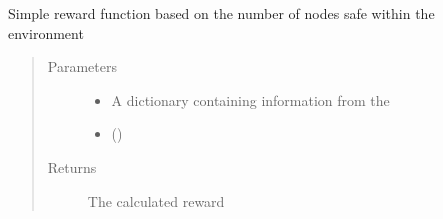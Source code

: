 \documentclass[letterpaper,10pt,english]{sphinxmanual}
\begin{document}
\begin{fulllineitems}
\label{\detokenize{source/yawning_titan.envs.generic.core:yawning_titan.envs.generic.core.reward_functions.num_nodes_safe}}
\sphinxAtStartPar
Simple reward function based on the number of nodes safe
within the environment
\begin{quote}\begin{description}
\item[{Parameters}] \leavevmode\begin{itemize}
\item {}
\sphinxAtStartPar
{} \textendash{} A dictionary containing information from the

\item {}
\sphinxAtStartPar
{} () \textendash{}

\end{itemize}

\item[{Returns}] \leavevmode
\sphinxAtStartPar
The calculated reward

\end{description}\end{quote}

\end{fulllineitems}

\end{document}
